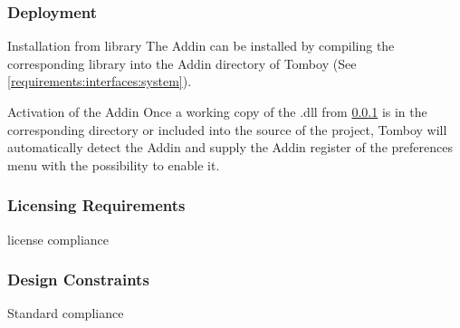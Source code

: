     \subsubsection{Deployment}
    \label{requirements:deployment}
    \begin{requirement}{Installation from library}
      \label{requirements:deployment:installation}
      The Addin can be installed by compiling the corresponding library into the Addin directory of Tomboy (See \ref{requirements:interfaces:system}).
    \end{requirement}

    \begin{requirement}{Activation of the Addin}
      \label{requirements:deployment:activation}
      Once a working copy of the .dll from \ref{requirements:deployment} is in the corresponding directory or included into the source of the project, Tomboy will automatically detect the Addin and supply the Addin register of the preferences menu with the possibility to enable it.
    \end{requirement}

    \subsubsection{Licensing Requirements}
    \label{requirements:license}
    \begin{requirement}{license compliance}
      \label{requirements:license:compliance}
    \end{requirement}


    \subsubsection{Design Constraints}
    \label{requirements:constraints}
    \begin{requirement}{Standard compliance}
      \label{requirements:constraints:standards}
    \end{requirement}


    \label{requirements:nonfunctional_end}